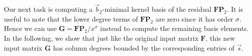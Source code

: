 Our next task is computing a $\vec{b}_{2}$-minimal kernel basis of
the residual $\mathbf{F}\mathbf{P}_{2}$. It is useful to note that
the lower degree terms of $\mathbf{F}\mathbf{P}_{2}$ are zero since
it has order $\sigma$. Hence we can use $\mathbf{G}=\mathbf{F}\mathbf{P}_{2}/x^{\sigma}$
instead to compute the remaining basis elements. In the following,
we show that just like the original input matrix $\mathbf{F}$, this
new input matrix $\mathbf{G}$ has column degrees bounded by the corresponding
entries of $\vec{s}$.%
\begin{comment}
However we still need to verify that the size of $\mathbf{G}$ is
small enough to allow for the efficient computation of the remaining
basis elements. 
\end{comment}
\begin{comment}
\prettyref{lem:boundOnShiftedDegrees} and \prettyref{cor:boundOnFPAfterLowerTermsRemoved}
shows that $\vec{b}-\sigma$, which bound the column degrees of $\mathbf{F}\mathbf{P}/x^{\sigma}$
by \prettyref{lem:boundOnDegreesOfFA}, are bounded by the corresponding
entries of $\vec{s}$. 
\end{comment}

